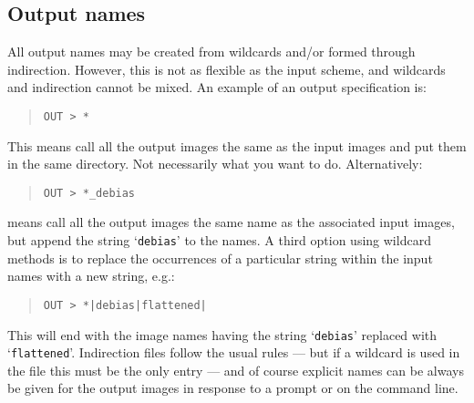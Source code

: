 \documentclass[twoside,11pt]{article}
\renewcommand{\_}{\texttt{\symbol{95}}}
\newenvironment{myquote}{\begin{quote}\begin{small}}{\end{small}\end{quote}}
\newcommand{\text}[1]{{\small \tt #1}}
\begin{document}
\subsection{Output names}

All output names may be created from wildcards and/or formed through
indirection. However, this is not as flexible as the input scheme,
and wildcards and indirection cannot be mixed. An example of an
output specification is:
\begin{myquote}
\begin{verbatim}
OUT > *
\end{verbatim}
\end{myquote}
This means call all the output images the same as the input images and put
them in the same directory.
Not necessarily what you want to do.
Alternatively:
\begin{myquote}
\begin{verbatim}
OUT > *_debias
\end{verbatim}
\end{myquote}
means call all the output images the same name as the associated
input images, but append the string `\text{\_debias}' to the names. A
third option using wildcard methods is to replace the occurrences of a
particular string within the input names with a new string, e.g.:
\begin{myquote}
\begin{verbatim}
OUT > *|debias|flattened|
\end{verbatim}
\end{myquote}
This will end with the image names having the string `\text{debias}'
replaced with `\text{flattened}'. Indirection files follow the usual
rules --- but if a wildcard is used in the file this must be the only
entry --- and of course explicit names can be always be given for the
output images in response to a prompt or on the command line.
\end{document}
